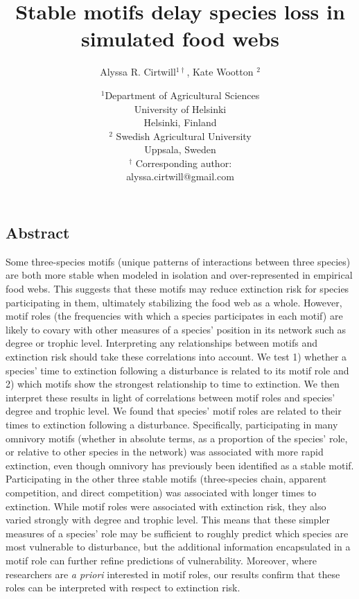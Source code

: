 \documentclass[12pt]{article}
\title{Stable motifs delay species loss in simulated food webs}
\author{Alyssa R. Cirtwill$^{1\dagger}$, Kate Wootton $^{2}$}
\date{\small$^1$Department of Agricultural Sciences\\ 
University of Helsinki\\
Helsinki, Finland\\
\medskip
\small$^2$ Swedish Agricultural University\\
Uppsala, Sweden\\
\medskip
$^\dagger$ Corresponding author:\\
alyssa.cirtwill@gmail.com\\
 }
\begin{document}
 
\raggedright
\setlength{\parindent}{15pt} 

\clearpage
\linenumbers
\begin{spacing}{2.0}

\section*{Abstract} %
    Some three-species motifs (unique patterns of interactions between three species) are both more stable when modeled in isolation and over-represented in empirical food webs. This suggests that these motifs may reduce extinction risk for species participating in them, ultimately stabilizing the food web as a whole. 
    However, motif roles (the frequencies with which a species participates in each motif) are likely to covary with other measures of a species' position in its network such as degree or trophic level. 
    Interpreting any relationships between motifs and extinction risk should take these correlations into account.
    We test 1) whether a species' time to extinction following a disturbance is related to its motif role and 2) which motifs show the strongest relationship to time to extinction.
    We then interpret these results in light of correlations between motif roles and species' degree and trophic level.
    We found that species' motif roles are related to their times to extinction following a disturbance. Specifically, participating in many omnivory motifs (whether in absolute terms, as a proportion of the species' role, or relative to other species in the network) was associated with more rapid extinction, even though omnivory has previously been identified as a stable motif. Participating in the other three stable motifs (three-species chain, apparent competition, and direct competition) was associated with longer times to extinction.
    While motif roles were associated with extinction risk, they also varied strongly with degree and trophic level. This means that these simpler measures of a species' role may be sufficient to roughly predict which species are most vulnerable to disturbance, but the additional information encapsulated in a motif role can further refine predictions of vulnerability. Moreover, where researchers are \emph{a priori} interested in motif roles, our results confirm that these roles can be interpreted with respect to extinction risk.%


\end{spacing}
\end{document}
